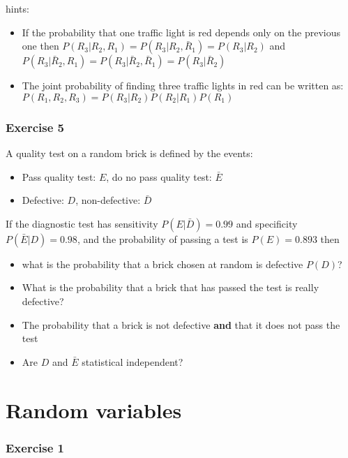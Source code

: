 \documentclass[
]{book}
\providecommand{\tightlist}{%
  \setlength{\itemsep}{0pt}\setlength{\parskip}{0pt}}
\begin{document}
hints:

\begin{itemize}
\item
  If the probability that one traffic light is red depends only on the previous one then
  \(P(R_3|R_2,R_1)=P(R_3|R_2,\bar{R}_1)=P(R_3|R_2)\) and \(P(R_3|\bar{R}_2,R_1)=P(R_3|\bar{R}_2,\bar{R}_1)=P(R_3|\bar{R}_2)\)
\item
  The joint probability of finding three traffic lights in red can be written as:
  \(P(R_1,R_2,R_3)=P(R_3|R_2)P(R_2|R_1)P(R_1)\)
\end{itemize}

\hypertarget{exercise-5}{%
\subsubsection{Exercise 5}\label{exercise-5}}

A quality test on a random brick is defined by the events:

\begin{itemize}
\tightlist
\item
  Pass quality test: \(E\), do no pass quality test: \(\bar{E}\)
\item
  Defective: \(D\), non-defective: \(\bar{D}\)
\end{itemize}

If the diagnostic test has sensitivity \(P(E|\bar{D})=0.99\) and specificity \(P(\bar{E}|D)=0.98\), and the probability of passing a test is \(P(E)=0.893\) then

\begin{itemize}
\item
  what is the probability that a brick chosen at random is defective \(P(D)\)?
\item
  What is the probability that a brick that has passed the test is really defective?
\item
  The probability that a brick is not defective \textbf{and} that it does not pass the test
\item
  Are \(D\) and \(\bar{E}\) statistical independent?
\end{itemize}

\hypertarget{random-variables}{%
\section{Random variables}\label{random-variables}}

\hypertarget{exercise-1-3}{%
\subsubsection{Exercise 1}\label{exercise-1-3}}
\end{document}
